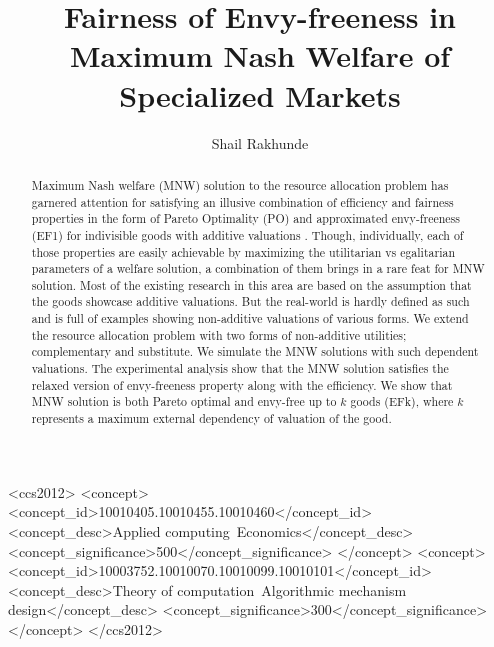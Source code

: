 \documentclass[sigconf]{acmart}
\theoremstyle{plain}
\theoremstyle{definition}
\begin{document}
\title{Fairness of Envy-freeness in Maximum Nash Welfare of Specialized Markets}


\author{Shail Rakhunde}


\begin{abstract}
\label{section_abstract}

Maximum Nash welfare (MNW) solution to the resource allocation problem has garnered attention for satisfying an illusive combination of efficiency and fairness properties in the form of Pareto Optimality (PO) and approximated envy-freeness (EF1) for indivisible goods with additive valuations \cite{caragiannis2016unreasonable}. Though, individually, each of those properties are easily achievable by maximizing the utilitarian vs egalitarian parameters of a welfare solution, a combination of them brings in a rare feat for MNW solution. Most of the existing research in this area are based on the assumption that the goods showcase additive valuations. But the real-world is hardly defined as such and is full of examples showing non-additive valuations of various forms. We extend the resource allocation problem with two forms of non-additive utilities; complementary and substitute. We simulate the MNW solutions with such dependent valuations. The experimental analysis show that the MNW solution satisfies the relaxed version of envy-freeness property along with the efficiency.  We show that MNW solution is both Pareto optimal and envy-free up to $k$ goods (EFk), where $k$ represents a maximum external dependency of valuation of the good.

\end{abstract}

%
%
\begin{CCSXML}
<ccs2012>
<concept>
<concept_id>10010405.10010455.10010460</concept_id>
<concept_desc>Applied computing~Economics</concept_desc>
<concept_significance>500</concept_significance>
</concept>
<concept>
<concept_id>10003752.10010070.10010099.10010101</concept_id>
<concept_desc>Theory of computation~Algorithmic mechanism design</concept_desc>
<concept_significance>300</concept_significance>
</concept>
</ccs2012>
\end{CCSXML}




\maketitle





\end{document}

